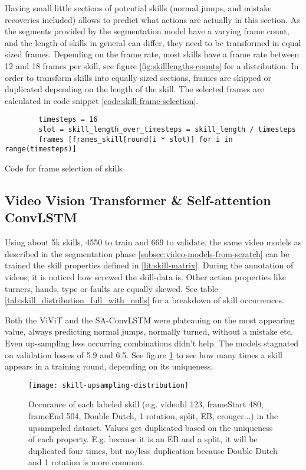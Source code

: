 Having small little sections of potential skills (normal jumps, and mistake recoveries included) allows to predict what actions are actually in this section.
As the segments provided by the segmentation model have a varying frame count, and the length of skills in general can differ, they need to be transformed in equal sized frames.
Depending on the frame rate, most skills have a frame rate between 12 and 18 frames per skill, see figure \ref{fig:skilllengths-counts} for a distribution. In order to transform skills into equally sized sections, frames are skipped or duplicated depending on the length of the skill.
The selected frames are calculated in code snippet \ref{code:skill-frame-selection}.


\begin{listing}
    \begin{verbatim}
        timesteps = 16
        slot = skill_length_over_timesteps = skill_length / timesteps
        frames [frames_skill[round(i * slot)] for i in range(timesteps)]
    \end{verbatim}
    \caption[Code for frame selection skills]{Code for frame selection of skills}
    \label{code:skill-frame-selection}
\end{listing}



\subsection{Video Vision Transformer \& Self-attention ConvLSTM}

Using about 5k skills, 4550 to train and 669 to validate, the same video models as described in the segmentation phase \ref{subsec:video-models-from-scratch} can be trained the skill properties defined in \ref{lit:skill-matrix}.
During the annotation of videos, it is noticed how screwed the skill-data is. Other action properties like turners, hands, type or faults are equally skewed. See table \ref{tab:skill_distribution_full_with_nulls} for a breakdown of skill occurrences.

Both the ViViT and the SA-ConvLSTM were plateauing on the most appearing value, always predicting normal jumps, normally turned, without a mistake etc.
Even up-sampling less occurring combinations didn't help. The models stagnated on validation losses of 5.9 and 6.5. See figure \ref{fig:skill-upsampling-distribution} to see how many times a skill appears in a training round, depending on its uniqueness.

\begin{figure}
    \centering
    \texttt{[image: skill-upsampling-distribution]}
    \caption[upsampling distribution of skills]{Occurance of each labeled skill (e.g. videoId 123, frameStart 480, frameEnd 504, Double Dutch, 1 rotation, split, EB, crouger...) in the upsampeled dataset. Values get duplicated based on the uniqueness of each property. E.g. because it is an EB and a split, it will be duplicated four times, but no/less duplication because Double Dutch and 1 rotation is more common.}
    \label{fig:skill-upsampling-distribution}
\end{figure}

